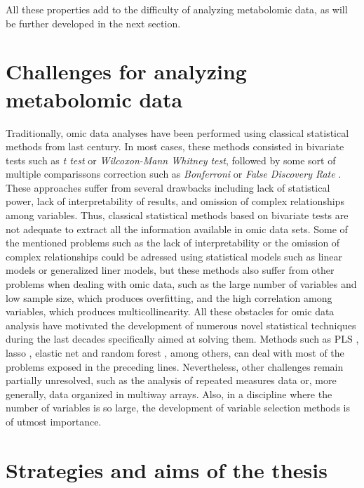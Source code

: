All these properties add to the difficulty of analyzing metabolomic data, as will be further developed in the next section.

\section{Challenges for analyzing metabolomic data}
\label{sec:challengesmetabodata}
Traditionally, omic data analyses have been performed using classical statistical methods from last century. In most cases, these methods consisted in bivariate tests such as \textit{t test} or \textit{Wilcoxon-Mann Whitney test}, followed by some sort of multiple comparissons correction such as \textit{Bonferroni} or \textit{False Discovery Rate} \parencite{hochberg1990more, benjamini1995controlling}. These approaches suffer from several drawbacks including lack of statistical power, lack of interpretability of results, and omission of complex relationships among variables. Thus, classical statistical methods based on bivariate tests are not adequate to extract all the information available in omic data sets.
Some of the mentioned problems such as the lack of interpretability or the omission of complex relationships could be adressed using statistical models such as linear models or generalized liner models, but these methods also suffer from other problems when dealing with omic data, such as the large number of variables and low sample size, which produces overfitting, and the high correlation among variables, which produces multicollinearity. All these obstacles for omic data analysis have motivated the development of numerous novel statistical techniques during the last decades specifically aimed at solving them. Methods such as PLS \parencite{wold1984collinearity}, lasso \parencite{tibshirani1996regression}, elastic net \parencite{zou2005regularization} and random forest \parencite{breiman2001random}, among others, can deal with most of the problems exposed in the preceding lines. Nevertheless, other challenges remain partially unresolved, such as the analysis of repeated measures data or, more generally, data organized in multiway arrays. Also, in a discipline where the number of variables is so large, the development of variable selection methods is of utmost importance.

\section{Strategies and aims of the thesis}
\label{sec:strategiesthesis}


